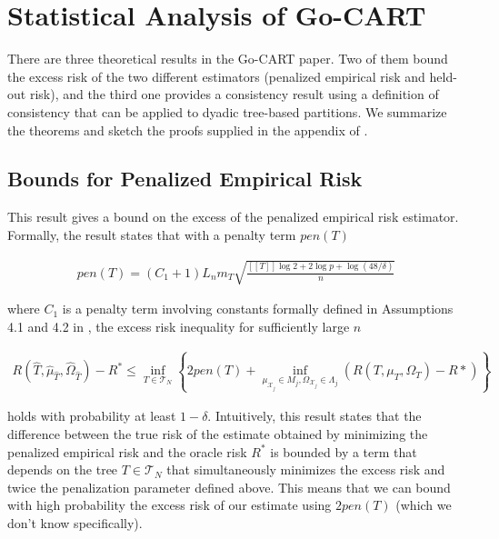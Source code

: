 \documentclass[12pt]{article}
\begin{document}
\section{Statistical Analysis of Go-CART}

There are three theoretical results in the Go-CART paper. Two of them bound the excess risk of the two different estimators (penalized empirical risk and held-out risk), and the third one provides a consistency result using a definition of consistency that can be applied to dyadic tree-based partitions. We summarize the theorems and sketch the proofs supplied in the appendix of \cite{liu2010}.

\subsection{Bounds for Penalized Empirical Risk}

This result gives a bound on the excess of the penalized empirical risk estimator. Formally, the result states that with a penalty term $pen(T)$

\begin{align}
    pen(T) = (C_1 + 1) L_n m_T
    \sqrt{
        \frac{[[T]] \log 2 + 2 \log p + \log(48/\delta)}
        {n}
    }
\end{align}

where $C_1$ is a penalty term involving constants formally defined in Assumptions 4.1 and 4.2 in \cite{liu2010}, the excess risk inequality for sufficiently large $n$

\begin{align}
    R(\hat{T}, \hat{\mu}_{\hat{T}}, \hat{\Omega}_{\hat{T}}) - R^*
    \le \underset{T \in \mathcal{T}_N}{\inf} \left\{
        2 pen(T)
        + \underset{\mu_{\mathcal{X}_j} \in M_j,\Omega_{\mathcal{X}_j} \in \Lambda_j}{\inf}
        (R(T, \mu_T, \Omega_T) - R*)
    \right\}
\end{align}

holds with probability at least $1 - \delta$. Intuitively, this result states that the difference between the true risk of the estimate obtained by minimizing the penalized empirical risk and the oracle risk $R^*$ is bounded by a term that depends on the tree $T \in \mathcal{T}_N$ that simultaneously minimizes the excess risk and twice the penalization parameter defined above. This means that we can bound with high probability the excess risk of our estimate using $2 pen(T)$ (which we don't know specifically).
\end{document}
